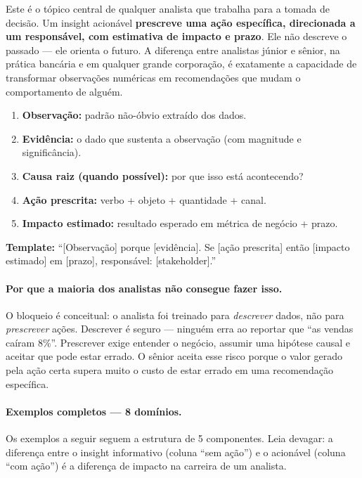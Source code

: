 Este é o tópico central de qualquer analista que trabalha para a tomada de decisão. Um insight acionável \textbf{prescreve uma ação específica, direcionada a um responsável, com estimativa de impacto e prazo}. Ele não descreve o passado --- ele orienta o futuro. A diferença entre analistas júnior e sênior, na prática bancária e em qualquer grande corporação, é exatamente a capacidade de transformar observações numéricas em recomendações que mudam o comportamento de alguém.

\begin{BoardBox}[title=Fórmula do Insight Acionável --- 5 Componentes]
\begin{enumerate}
  \item \textbf{Observação:} padrão não-óbvio extraído dos dados.
  \item \textbf{Evidência:} o dado que sustenta a observação (com magnitude e significância).
  \item \textbf{Causa raiz (quando possível):} por que isso está acontecendo?
  \item \textbf{Ação prescrita:} verbo + objeto + quantidade + canal.
  \item \textbf{Impacto estimado:} resultado esperado em métrica de negócio + prazo.
\end{enumerate}
\smallskip
\textbf{Template:} ``[Observação] porque [evidência]. Se [ação prescrita] então [impacto estimado] em [prazo], responsável: [stakeholder].''
\end{BoardBox}

\paragraph{Por que a maioria dos analistas não consegue fazer isso.}
O bloqueio é conceitual: o analista foi treinado para \emph{descrever} dados, não para \emph{prescrever} ações. Descrever é seguro --- ninguém erra ao reportar que ``as vendas caíram 8\%''. Prescrever exige entender o negócio, assumir uma hipótese causal e aceitar que pode estar errado. O sênior aceita esse risco porque o valor gerado pela ação certa supera muito o custo de estar errado em uma recomendação específica.

\paragraph{Exemplos completos --- 8 domínios.}

Os exemplos a seguir seguem a estrutura de 5 componentes. Leia devagar: a diferença entre o insight informativo (coluna ``sem ação'') e o acionável (coluna ``com ação'') é a diferença de impacto na carreira de um analista.

